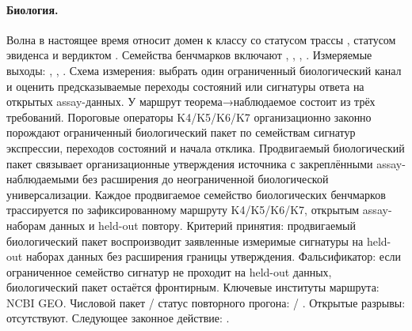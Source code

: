 \paragraph{Биология.}
Волна  в настоящее время относит домен к классу  со статусом трассы , статусом эвиденса  и вердиктом .
Семейства бенчмарков включают , \allowbreak {}, \allowbreak {}, \allowbreak {}.
Измеряемые выходы: , \allowbreak {}, \allowbreak {}.
Схема измерения: выбрать один ограниченный биологический канал и оценить предсказываемые переходы состояний или сигнатуры ответа на открытых assay-данных.
У маршрут теорема→наблюдаемое состоит из трёх требований. Пороговые операторы K4/K5/K6/K7 организационно законно порождают ограниченный биологический пакет по семействам сигнатур экспрессии, переходов состояний и начала отклика. Продвигаемый биологический пакет связывает организационные утверждения источника с закреплёнными assay-наблюдаемыми без расширения до неограниченной биологической универсализации. Каждое продвигаемое семейство биологических бенчмарков трассируется по зафиксированному маршруту K4/K5/K6/K7, открытым assay-наборам данных и held-out повтору.
Критерий принятия: продвигаемый биологический пакет воспроизводит заявленные измеримые сигнатуры на held-out наборах данных без расширения границы утверждения.
Фальсификатор: если ограниченное семейство сигнатур не проходит на held-out данных, биологический пакет остаётся фронтирным.
Ключевые институты маршрута: NCBI GEO.
Числовой пакет / статус повторного прогона:  / .
Открытые разрывы: отсутствуют.
Следующее законное действие: .

